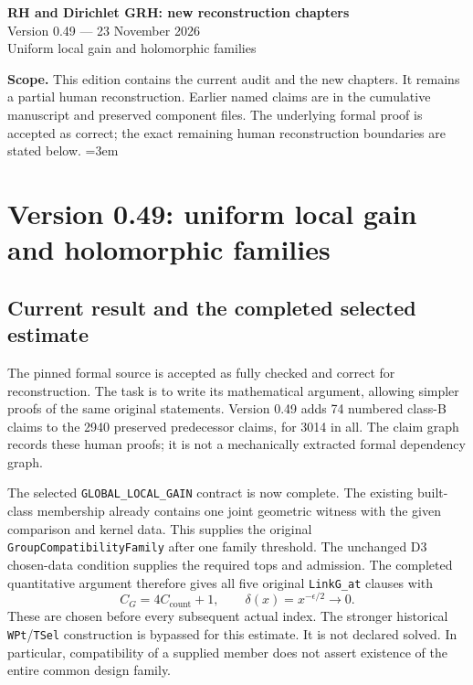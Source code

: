 \documentclass[11pt,a4paper]{article}
\numberwithin{equation}{section}
\theoremstyle{remark}\newtheorem{remark}[theorem]{Remark}
\begin{document}
\begin{center}
{\LARGE\bfseries RH and Dirichlet GRH: new reconstruction chapters}\\[7pt]
{\large Version 0.49 --- 23 November 2026}\\[5pt]
{\large Uniform local gain and holomorphic families}
\end{center}
\textbf{Scope.} This edition contains the current audit and the new
chapters. It remains a partial human reconstruction. Earlier named
claims are in the cumulative manuscript and preserved component files.
The underlying formal proof is accepted as correct; the exact remaining
human reconstruction boundaries are stated below.
\setcounter{tocdepth}{1}
\tableofcontents
\clearpage
\begingroup\emergencystretch=3em
\section{Version 0.49: uniform local gain and holomorphic families}
\label{sec:dependency-audit-v49}

\subsection{Current result and the completed selected estimate}

The pinned formal source is accepted as fully checked and correct for
reconstruction. The task is to write its mathematical argument,
allowing simpler proofs of the same original statements. Version 0.49
adds 74 numbered class-B claims to the 2940 preserved predecessor
claims, for 3014 in all. The claim graph records these human proofs;
it is not a mechanically extracted formal dependency graph.

The selected \texttt{GLOBAL\_\allowbreak LOCAL\_\allowbreak GAIN} contract is now complete.
The existing built-class membership already contains one joint
geometric witness with the given comparison and kernel data. This
supplies the original \texttt{Group\allowbreak Compatibility\allowbreak Family} after one
family threshold. The unchanged D3 chosen-data condition supplies
the required tops and admission. The completed quantitative argument
therefore gives all five original \texttt{Link\allowbreak G\_\allowbreak at} clauses with
\[
 C_G=4C_{\mathrm{count}}+1,
 \qquad\delta(x)=x^{-\epsilon/2}\longrightarrow0.
\]
These are chosen before every subsequent actual index. The stronger
historical \texttt{WPt}/\texttt{TSel} construction is bypassed for
this estimate. It is not declared solved. In particular, compatibility
of a supplied member does not assert existence of the entire common
design family.
\end{document}
